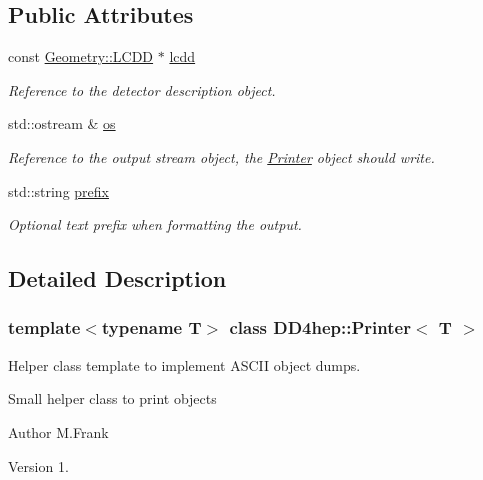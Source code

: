 \subsection*{Public Attributes}
\begin{DoxyCompactItemize}
\item 
const \hyperlink{class_d_d4hep_1_1_geometry_1_1_l_c_d_d}{Geometry\+::\+L\+C\+DD} $\ast$ \hyperlink{struct_d_d4hep_1_1_printer_a09e1761c59664ca7953a3bead1f44dd4}{lcdd}
\begin{DoxyCompactList}\small\item\em Reference to the detector description object. \end{DoxyCompactList}\item 
std\+::ostream \& \hyperlink{struct_d_d4hep_1_1_printer_a1ec1ad8ef8150a32854541bec0f9d7c8}{os}
\begin{DoxyCompactList}\small\item\em Reference to the output stream object, the \hyperlink{struct_d_d4hep_1_1_printer}{Printer} object should write. \end{DoxyCompactList}\item 
std\+::string \hyperlink{struct_d_d4hep_1_1_printer_a59b1bd251047feee01c469a91564a320}{prefix}
\begin{DoxyCompactList}\small\item\em Optional text prefix when formatting the output. \end{DoxyCompactList}\end{DoxyCompactItemize}


\subsection{Detailed Description}
\subsubsection*{template$<$typename T$>$\newline
class D\+D4hep\+::\+Printer$<$ T $>$}

Helper class template to implement A\+S\+C\+II object dumps. 

Small helper class to print objects

\begin{DoxyAuthor}{Author}
M.\+Frank 
\end{DoxyAuthor}
\begin{DoxyVersion}{Version}
1. 
\end{DoxyVersion}


